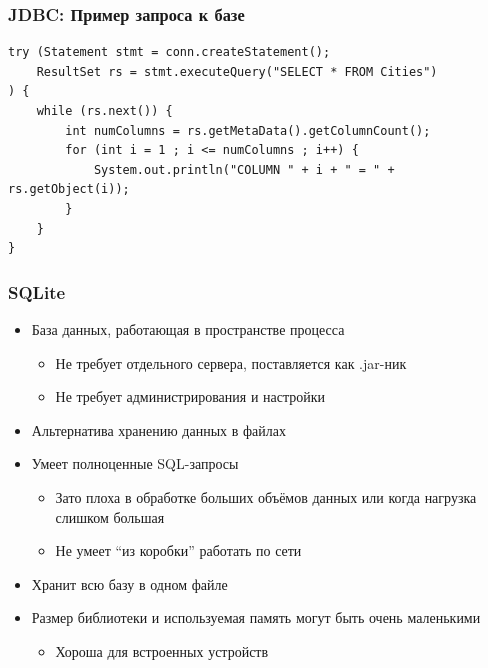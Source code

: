 \documentclass[xetex,mathserif,serif]{beamer}
\begin{document}
	\begin{frame}[fragile]
		\frametitle{JDBC: Пример запроса к базе}
		\begin{footnotesize}
			\begin{verbatim}
try (Statement stmt = conn.createStatement();
    ResultSet rs = stmt.executeQuery("SELECT * FROM Cities")
) {
    while (rs.next()) {
        int numColumns = rs.getMetaData().getColumnCount();
        for (int i = 1 ; i <= numColumns ; i++) {
            System.out.println("COLUMN " + i + " = " + rs.getObject(i));
        }
    }
}
			\end{verbatim}
		\end{footnotesize}
	\end{frame}

	\begin{frame}
		\frametitle{SQLite}
		\begin{itemize}
			\item База данных, работающая в пространстве процесса
			\begin{itemize}
				\item Не требует отдельного сервера, поставляется как .jar-ник
				\item Не требует администрирования и настройки
			\end{itemize}
			\item Альтернатива хранению данных в файлах
			\item Умеет полноценные SQL-запросы
			\begin{itemize}
				\item Зато плоха в обработке больших объёмов данных или когда нагрузка слишком большая
				\item Не умеет ``из коробки'' работать по сети
			\end{itemize}
			\item Хранит всю базу в одном файле
			\item Размер библиотеки и используемая память могут быть очень маленькими
			\begin{itemize}
				\item Хороша для встроенных устройств
			\end{itemize}
		\end{itemize}
	\end{frame}
\end{document}
